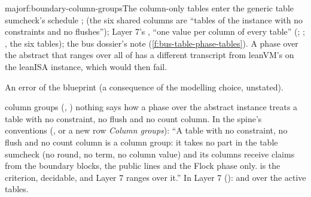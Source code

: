 \begin{finding}{major}{f:boundary-column-groups}{The column-only tables enter the generic table sumcheck's schedule}
 ;  (the six shared columns are
\enquote{tables of the instance with no constraints and no flushes}); Layer 7's ,
\enquote{one value per column of every table} (;
; , the six tables); the bus
dossier's note (\cref{f:bus-table-phase-tables}). A phase over the abstract  that ranges
over all of  has a different transcript from leanVM's on the leanISA instance, which
 would then fail.

 An error of the blueprint (a consequence of the modelling choice, unstated).

\begin{change}{column groups (, )}
\asis nothing says how a phase over the abstract instance treats a table with no constraint, no
flush and no count column.
\asproposed In the spine's conventions (, or a new row \emph{Column groups}):
\enquote{A table with no constraint, no flush and no count column is a column group: it takes no
part in the table sumcheck (no round, no term, no column value) and its columns receive claims
from the boundary blocks, the public lines and the Flock phase only.
 is the
criterion, decidable, and Layer 7 ranges over it.} In Layer 7 ():  and
 over the active tables.
\end{change}
\end{finding}

